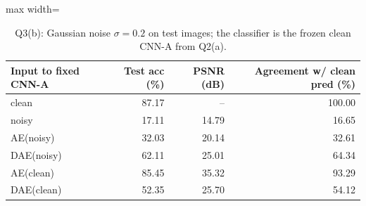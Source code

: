 \begin{table}[t]\centering\footnotesize\setlength{\tabcolsep}{3pt}
\begin{adjustbox}{max width=\columnwidth}
\begin{tabular}{lrrr}\toprule
Input to fixed CNN-A & Test acc (\%) & PSNR (dB) & Agreement w/ clean pred (\%) \\\midrule
clean & 87.17 & -- & 100.00 \\
noisy & 17.11 & 14.79 & 16.65 \\
AE(noisy) & 32.03 & 20.14 & 32.61 \\
DAE(noisy) & 62.11 & 25.01 & 64.34 \\
AE(clean) & 85.45 & 35.32 & 93.29 \\
DAE(clean) & 52.35 & 25.70 & 54.12 \\
\bottomrule\end{tabular}
\end{adjustbox}
\caption{Q3(b): Gaussian noise $\sigma=0.2$ on test images; the classifier is the frozen clean CNN-A from Q2(a).}\label{tab:q3b}\end{table}
